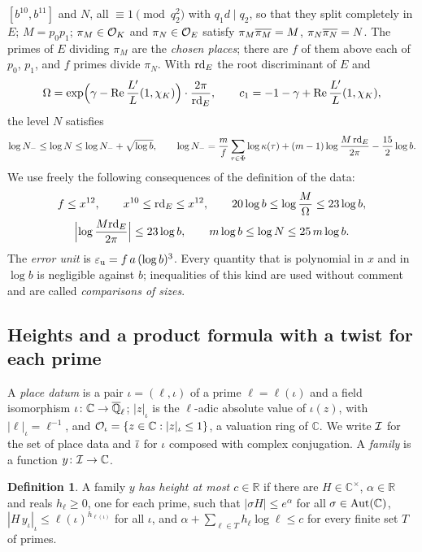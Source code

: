 \documentclass[10pt]{amsart}
\theoremstyle{definition}
\newtheorem{definition}[theorem]{Definition}
\theoremstyle{remark}
\newcommand{\C}{\mathbb C}
\newcommand{\R}{\mathbb R}
\newcommand{\Rel}{\operatorname{Re}}
\begin{document}
$[b^{10},b^{11}]$ and $N$, all $\equiv1\pmod{q_2^2}$ with $q_1d\mid q_2$, so that they split
completely in $E$; $M=p_0p_1$; $\pi_M\in\mathcal O_K$ and $\pi_N\in\mathcal O_E$ satisfy
$\pi_M\overline{\pi_M}=M$, $\pi_N\overline{\pi_N}=N$. The primes of $E$ dividing $\pi_M$ are the
\emph{chosen places}; there are $f$ of them above each of $p_0$, $p_1$, and $f$ primes divide
$\pi_N$. With $\mathrm{rd}_E$ the root discriminant of $E$ and
\[
\Omega=\exp\Bigl(\gamma-\Rel\frac{L'}{L}(1,\auchi)\Bigr)\cdot\frac{2\pi}{\aurd},\qquad
c_1=-1-\gamma+\Rel\frac{L'}{L}(1,\auchi),
\]
the level $N$ satisfies
\begin{equation}\label{eq:au-level}
\log N_-\le\log N\le\log N_-+\sqrt{\log b},\qquad
\log N_-=\frac mf\sum_{\tau\in\Phi}\log\kappa(\tau)+(m-1)\log\frac{M\,\mathrm{rd}_E}{2\pi}-\frac{15}{2}\log b .
\end{equation}
We use freely the following consequences of the definition of the data:
\begin{equation}\label{eq:au-sizes}
\begin{gathered}
f\le x^{12},\qquad x^{10}\le\mathrm{rd}_E\le x^{12},\qquad 20\log b\le\log\frac M\Omega\le23\log b,\\
\Bigl|\log\frac{M\mathrm{rd}_E}{2\pi}\Bigr|\le23\log b,\qquad m\log b\le\log N\le25\,m\log b .
\end{gathered}
\end{equation}
The \emph{error unit} is $\varepsilon_{\mathrm u}=f\,a\,(\log b)^3$. Every quantity that is polynomial in $x$ and in
$\log b$ is negligible against $b$; inequalities of this kind are used without comment and are
called \emph{comparisons of sizes}.

\subsection{Heights and a product formula with a twist for each prime}\label{ss:au-heights}

A \emph{place datum} is a pair $\iota=(\ell,\iota)$ of a prime $\ell=\ell(\iota)$ and a field
isomorphism $\iota\colon\C\to\auQlb$; $|z|_\iota$ is the $\ell$-adic absolute value of $\iota(z)$,
with $|\ell|_\iota=\ell^{-1}$, and $\auO_\iota=\{z\in\C:|z|_\iota\le1\}$, a valuation ring of $\C$.
We write $\mathcal I$ for the set of place data and $\overline{\iota}$ for $\iota$ composed with complex
conjugation. A \emph{family} is a function $y\colon\auI\to\C$.

\begin{definition}\label{def:au-height}
A family $y$ \emph{has height at most $c\in\R$} if there are $H\in\C^\times$, $\alpha\in\R$ and
reals $h_\ell\ge0$, one for each prime, such that $|\sigma H|\le e^\alpha$ for all
$\sigma\in\auAut(\C)$, $|H\,y_\iota|_\iota\le\ell(\iota)^{h_{\ell(\iota)}}$ for all $\iota$, and
$\alpha+\sum_{\ell\in T}h_\ell\log\ell\le c$ for every finite set $T$ of primes.
\end{definition}
\end{document}
